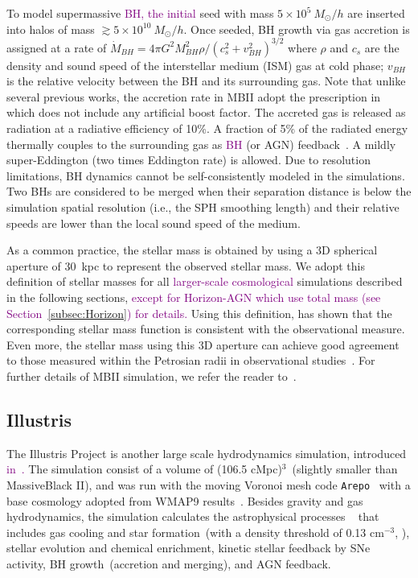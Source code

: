 \documentclass[twocolumn]{aastex631}
\newcommand{\red}[1]{\textcolor{purple}{#1}}
\begin{document}
To model supermassive \red{BH, the initial} seed with mass $5\times 10^{5}~M_{\odot}/h$ are inserted into halos of mass $\gtrsim 5\times 10^{10}~M_{\odot}/h$. Once seeded, BH growth via gas accretion is assigned at a rate of $\dot{M}_{BH}={4\pi G^2 M_{BH}^2 \rho}/{(c_s^2+v_{BH}^2)^{3/2}}$ where $\rho$ and $c_s$ are the density and sound speed of the interstellar medium (ISM) gas at cold phase; $v_{BH}$ is the relative velocity between the BH and its surrounding gas. Note that unlike several previous works, the accretion rate in MBII adopt the prescription in~\citet{Pelupessy2007} which does not include any artificial boost factor. The accreted gas is released as radiation at a radiative efficiency of 10\%. A fraction of 5\% of the radiated energy thermally couples to the surrounding gas as \red{BH} (or AGN) feedback~\citep{2005Natur.433..604D}. A mildly super-Eddington (two times Eddington rate) is allowed. Due to resolution limitations, BH dynamics cannot be self-consistently modeled in the simulations. Two BHs are considered to be merged when their separation distance is below the simulation spatial resolution (i.e., the SPH smoothing length) and their relative speeds are lower than the local sound speed of the medium.

As a common practice, the stellar mass is obtained by using a 3D spherical aperture of 30~kpc to represent the observed stellar mass.
We adopt this definition of stellar masses for all \red{larger-scale cosmological} simulations described in the following sections, \red{except for Horizon-AGN which use total mass (see Section~\ref{subsec:Horizon}) for details.}  Using this definition, \citet{Pillepich2018} has shown that the corresponding stellar mass function is consistent with the observational measure. Even more, the stellar mass using this 3D aperture can achieve good agreement to those measured within the Petrosian radii in observational studies~\citep{Schaye2015}. For further details of MBII simulation, we refer the reader to~\citet{Khandai2015}.

\subsection{Illustris}
The Illustris Project is another large scale hydrodynamics simulation, introduced \red{in~\citet{Genel2014, 2014MNRAS.444.1518V, 2014Natur.509..177V, Sijacki2015, Nelson2015}.} The simulation consist of a volume of (106.5 cMpc)$^3$~(slightly smaller than MassiveBlack II), 
and was run with the moving Voronoi mesh code {\tt Arepo}~\citep{2010MNRAS.401..791S} with a base cosmology adopted from WMAP9 results~\citep{2013ApJS..208...19H}. Besides gravity and gas hydrodynamics, the simulation calculates the astrophysical processes ~\citep{2013MNRAS.436.3031V, 2014MNRAS.438.1985T} that includes gas cooling and star formation~(with a density threshold of 0.13 cm$^{-3}$, \citealt{2003MNRAS.339..289S}), stellar evolution and chemical enrichment, kinetic stellar feedback by SNe activity, BH growth~(accretion and merging), and AGN feedback.
\end{document}
